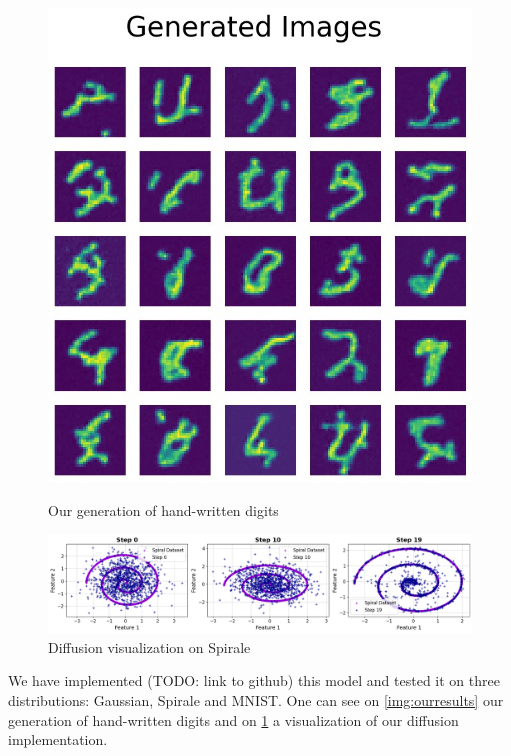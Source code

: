 \documentclass[a4paper,11pt]{article}
\begin{document}
\begin{figure}[h]
    \centering
    \begin{minipage}[b]{0.3\textwidth}
        \centering
        \includegraphics[width=\textwidth]{imgs/mnist_res.jpg}
        \caption{Our generation of hand-written digits}
        \label{img:ourresults}
    \end{minipage}
    \hfill
    \begin{minipage}[b]{0.65\textwidth}
        \centering
        \includegraphics[width=\textwidth]{imgs/res_spirale.png}
        \caption{Diffusion visualization on Spirale}
        \label{img:spiralresults}
    \end{minipage}
\end{figure}


We have implemented (TODO: link to github) this model and tested it on three distributions: Gaussian, Spirale and MNIST. One can see on \cref{img:ourresults} our generation of hand-written digits and on \cref{img:spiralresults} a visualization of our diffusion implementation.
\end{document}
